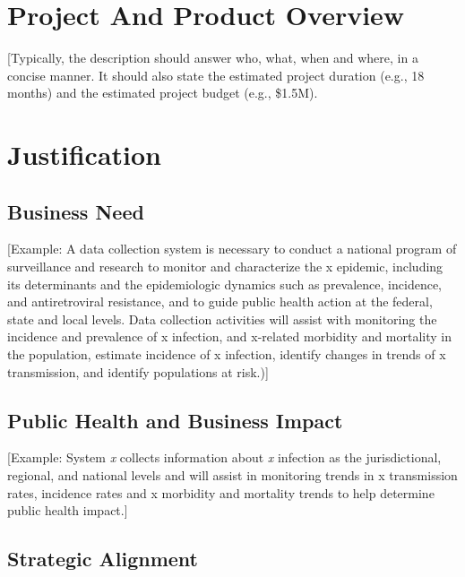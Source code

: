 \documentclass[a4paper, 11pt]{article}
\begin{document}
\hypertarget{project-and-product-overview}{%
\section{Project And Product Overview}\label{project-and-product-overview}}

{[}Typically, the description should answer who, what, when and where,
in a concise manner. It should also state the estimated project duration
(e.g., 18 months) and the estimated project budget (e.g., \$1.5M).

\hypertarget{justification}{%
\section{Justification}\label{justification}}

\hypertarget{business-need}{%
\subsection{Business Need}\label{business-need}}

{[}Example: A data collection system is necessary to conduct a national
program of surveillance and research to monitor and characterize the x
epidemic, including its determinants and the epidemiologic dynamics such
as prevalence, incidence, and antiretroviral resistance, and to guide
public health action at the federal, state and local levels. Data
collection activities will assist with monitoring the incidence and
prevalence of x infection, and x-related morbidity and mortality in the
population, estimate incidence of x infection, identify changes in
trends of x transmission, and identify populations at risk.){]}

\hypertarget{public-health-and-business-impact}{%
\subsection{Public Health and Business
Impact}\label{public-health-and-business-impact}}

{[}Example: System \emph{x} collects information about \emph{x}
infection as the jurisdictional, regional, and national levels and will
assist in monitoring trends in x transmission rates, incidence rates and
x morbidity and mortality trends to help determine public health
impact.{]}

\hypertarget{strategic-alignment}{%
\subsection{Strategic Alignment}\label{strategic-alignment}}
\end{document}
